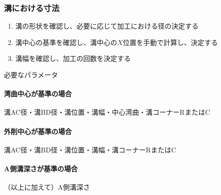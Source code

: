 \subsubsection{溝における寸法}
\begin{enumerate}
\item 溝の形状を確認し、必要に応じて加工における径の決定する
\item {}溝中心の基準を確認し、溝中心の$X$位置を手動で計算し、決定する
\item {}溝幅を確認し、加工の回数を決定する
\end{enumerate}
\begin{Parameter}{必要なパラメータ}
\paragraph*{湾曲中心が基準の場合}
溝AC径・溝BD径・溝位置・溝幅・中心湾曲・溝コーナーRまたはC
\tcbline*
\paragraph*{外削中心が基準の場合}
溝AC径・溝BD径・溝位置・溝幅・溝コーナーRまたはC
\tcbline*
\paragraph*{A側溝深さが基準の場合}
（以上に加えて）A側溝深さ
\end{Parameter}

